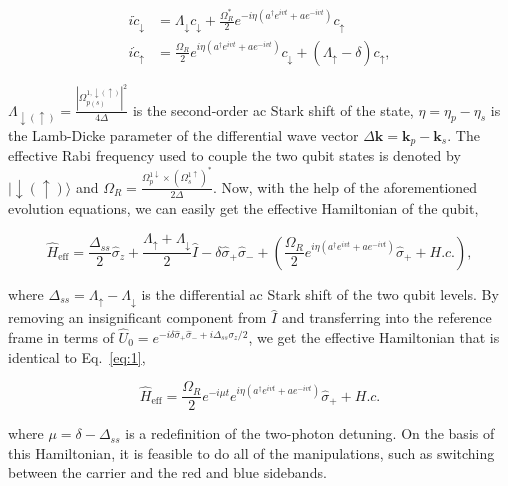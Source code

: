 \begin{equation}
    \begin{aligned}
        i \dot{c}_{\downarrow} & =\Lambda_{\downarrow} c_{\downarrow}+\frac{\Omega_R^*}{2} e^{-i \eta\left(a^{\dagger} e^{i v t}+a e^{-i v t}\right)} c_{\uparrow}                 \\
        i \dot{c}_{\uparrow}   & =\frac{\Omega_R}{2} e^{i \eta\left(a^{\dagger} e^{i v t}+a e^{-i v t}\right)} c_{\downarrow}+\left(\Lambda_{\uparrow}-\delta\right) c_{\uparrow},
    \end{aligned}
\end{equation}

$\Lambda_{\downarrow(\uparrow)}=\frac{\left|\Omega_{p(s)}^{1, \downarrow(\uparrow)}\right|^2}{4 \Delta}$ is the second-order ac Stark shift of the state, $\eta=\eta_p-\eta_s$ is the Lamb-Dicke parameter of the differential wave vector $\Delta \mathbf{k}=\mathbf{k}_p-\mathbf{k}_s$. The effective Rabi frequency used to couple the two qubit states is denoted by $|\downarrow(\uparrow)\rangle$ and $\Omega_R=\frac{\Omega^{1\downarrow}_p \times (\Omega^{1\uparrow}_s)^*}{2\Delta}$. Now, with the help of the aforementioned evolution equations, we can easily get the effective Hamiltonian of the qubit,

\begin{equation}
    \hat{H}_{\mathrm{eff}}=\frac{\Delta_{s s}}{2} \hat{\sigma}_z+\frac{\Lambda_{\uparrow}+\Lambda_{\downarrow}}{2} \hat{I}-\delta \hat{\sigma}_{+} \hat{\sigma}_{-}+\left(\frac{\Omega_R}{2} e^{i \eta\left(a^{\dagger} e^{i v t}+a e^{-i v t}\right)} \hat{\sigma}_{+}+H . c .\right),
\end{equation}

where $\Delta_{ss}=\Lambda_{\uparrow}-\Lambda_{\downarrow}$ is the differential ac Stark shift of the two qubit levels. By removing an insignificant component from $\hat{I}$ and transferring into the reference frame in terms of $\hat{U}_0=e^{-i\delta\hat{\sigma}_+\hat{\sigma}_-+i\Delta_{ss}\sigma_z/2}$, we get the effective Hamiltonian that is identical to Eq.~\eqref{eq:1},

\begin{equation}
    \hat{H}_{\mathrm{eff}}=\frac{\Omega_R}{2} e^{-i \mu t} e^{i \eta\left(a^{\dagger} e^{i v t}+a e^{-i v t}\right)} \hat{\sigma}_{+}+H . c .
\end{equation}

where $\mu=\delta-\Delta_{ss}$ is a redefinition of the two-photon detuning. On the basis of this Hamiltonian, it is feasible to do all of the manipulations, such as switching between the carrier and the red and blue sidebands.
